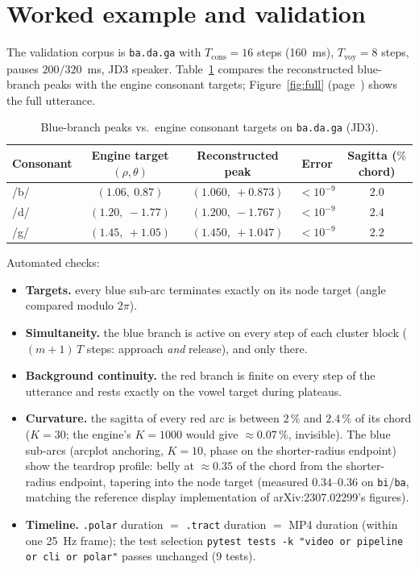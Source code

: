 \documentclass[11pt,a4paper]{article}
\newcommand{\code}[1]{\texttt{#1}}
\begin{document}
\section{Worked example and validation}

The validation corpus is \code{ba.da.ga} with
$T_{\text{cons}} = 16$ steps (160~ms), $T_{\text{voy}} = 8$ steps,
pauses $200/320$~ms, JD3 speaker. Table~\ref{tab:targets} compares
the reconstructed blue-branch peaks with the engine consonant
targets; Figure~\ref{fig:full} (page~\pageref{fig:full}) shows the
full utterance.

\begin{table}[ht]
\centering
\caption{Blue-branch peaks vs.\ engine consonant targets on
\code{ba.da.ga} (JD3).}
\label{tab:targets}
\begin{tabular}{@{}lcccc@{}}
\toprule
\textbf{Consonant} & \textbf{Engine target} $(\rho, \theta)$ &
\textbf{Reconstructed peak} & \textbf{Error} &
\textbf{Sagitta ($\%$ chord)} \\
\midrule
/b/ & $(1.06,\ 0.87)$ & $(1.060,\ +0.873)$ & $<10^{-9}$ & $2.0$ \\
/d/ & $(1.20,\ -1.77)$ & $(1.200,\ -1.767)$ & $<10^{-9}$ & $2.4$ \\
/g/ & $(1.45,\ +1.05)$ & $(1.450,\ +1.047)$ & $<10^{-9}$ & $2.2$ \\
\bottomrule
\end{tabular}
\end{table}

Automated checks:

\begin{itemize}[leftmargin=1.4em]
\item \textbf{Targets.} every blue sub-arc terminates exactly on its
      node target (angle compared modulo $2\pi$).
\item \textbf{Simultaneity.} the blue branch is active on every step
      of each cluster block ($ (m{+}1)\,T$ steps: approach
      \emph{and} release), and only there.
\item \textbf{Background continuity.} the red branch is finite on
      every step of the utterance and rests exactly on the vowel
      target during plateaus.
\item \textbf{Curvature.} the sagitta of every red arc is between
      $2\,\%$ and $2.4\,\%$ of its chord ($K = 30$; the engine's
      $K = 1000$ would give $\approx 0.07\,\%$, invisible). The blue
      sub-arcs (arcplot anchoring, $K = 10$, phase on the
      shorter-radius endpoint) show the teardrop profile: belly at
      $\approx 0.35$ of the chord from the shorter-radius endpoint,
      tapering into the node target (measured $0.34$--$0.36$ on
      \code{bi}/\code{ba}, matching the reference display
      implementation of arXiv:2307.02299's figures).
\item \textbf{Timeline.} \code{.polar} duration $=$ \code{.tract}
      duration $=$ MP4 duration (within one 25~Hz frame); the test
      selection \code{pytest tests -k "video or pipeline or cli or
      polar"} passes unchanged (9 tests).
\end{itemize}
\end{document}
